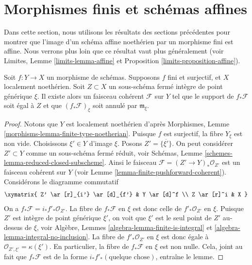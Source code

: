 \section{Morphismes finis et schémas affines}
\label{section-finite-affine}

\noindent
Dans cette section, nous utilisons les résultats des sections précédentes
pour montrer que l'image d'un schéma affine noethérien par un morphisme
fini est affine. Nous verrons plus loin que ce résultat vaut plus
généralement (voir Limites, Lemme \ref{limits-lemma-affine} et
Proposition \ref{limits-proposition-affine}).

\begin{lemma}
\label{lemma-finite-morphism-Noetherian}
Soit $f : Y \to X$ un morphisme de schémas.
Supposons $f$ fini et surjectif, et $X$ localement noethérien.
Soit $Z \subset X$ un sous-schéma fermé intègre de
point générique $\xi$. Il existe alors
un faisceau cohérent $\mathcal{F}$ sur $Y$
tel que le support de $f_*\mathcal{F}$ soit égal à $Z$
et que $(f_*\mathcal{F})_\xi$ soit annulé par $\mathfrak m_\xi$.
\end{lemma}

\begin{proof}
Notons que $Y$ est localement noethérien d'après
Morphismes, Lemme \ref{morphisms-lemma-finite-type-noetherian}.
Puisque $f$ est surjectif, la fibre $Y_\xi$ est non vide.
Choisissons $\xi' \in Y$ d'image $\xi$. Posons $Z' = \overline{\{\xi'\}}$.
On peut considérer $Z' \subset Y$ comme un sous-schéma fermé réduit,
voir Schémas, Lemme \ref{schemes-lemma-reduced-closed-subscheme}.
Ainsi le faisceau $\mathcal{F} = (Z' \to Y)_*\mathcal{O}_{Z'}$
est un faisceau cohérent sur $Y$ (voir
Lemme \ref{lemma-finite-pushforward-coherent}).
Considérons le diagramme commutatif
$$
\xymatrix{
Z' \ar[r]_{i'} \ar[d]_{f'} &
Y \ar[d]^f \\
Z \ar[r]^i &
X
}
$$
On a $f_*\mathcal{F} = i_*f'_*\mathcal{O}_{Z'}$.
La fibre de $f_*\mathcal{F}$ en $\xi$ est donc celle
de $f'_*\mathcal{O}_{Z'}$ en $\xi$. Puisque $Z'$ est
intègre de point générique $\xi'$, on voit que
$\xi'$ est le seul point de $Z'$ au-dessus de $\xi$, voir
Algèbre, Lemmes \ref{algebra-lemma-finite-is-integral} et
\ref{algebra-lemma-integral-no-inclusion}.
La fibre de $f'_*\mathcal{O}_{Z'}$ en $\xi$
est donc égale à $\mathcal{O}_{Z', \xi'} = \kappa(\xi')$. En particulier,
la fibre de $f_*\mathcal{F}$ en $\xi$ est non nulle.
Cela, joint au fait que $f_*\mathcal{F}$ est
de la forme $i_*f'_*(\text{quelque chose})$, entraîne le lemme.
\end{proof}

